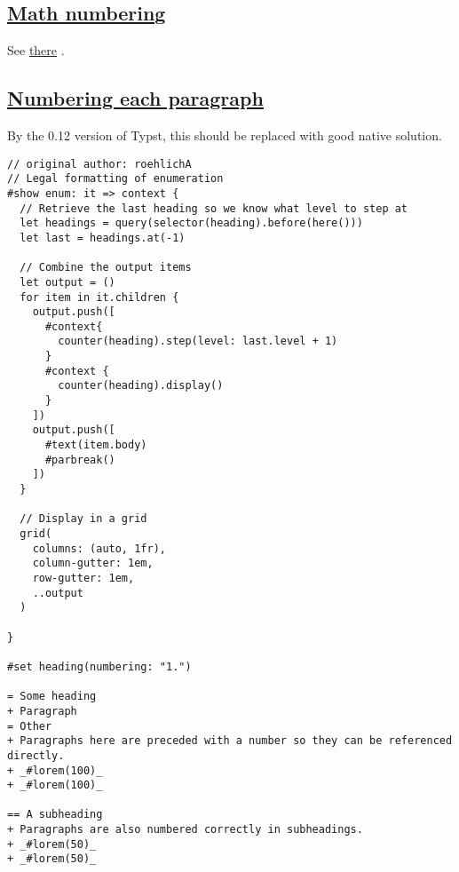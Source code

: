 \pandocbounded{}

\subsection{\texorpdfstring{\hyperref[math-numbering]{Math
numbering}}{Math numbering}}\label{math-numbering}

See \href{./math/numbering.html}{there} .

\subsection{\texorpdfstring{\hyperref[numbering-each-paragraph]{Numbering
each
paragraph}}{Numbering each paragraph}}\label{numbering-each-paragraph}

By the 0.12 version of Typst, this should be replaced with good native
solution.

\begin{verbatim}
// original author: roehlichA
// Legal formatting of enumeration
#show enum: it => context {
  // Retrieve the last heading so we know what level to step at
  let headings = query(selector(heading).before(here()))
  let last = headings.at(-1)

  // Combine the output items
  let output = ()
  for item in it.children {
    output.push([
      #context{
        counter(heading).step(level: last.level + 1)
      }
      #context {
        counter(heading).display() 
      }
    ])
    output.push([
      #text(item.body)
      #parbreak()
    ])
  }

  // Display in a grid
  grid(
    columns: (auto, 1fr),
    column-gutter: 1em,
    row-gutter: 1em,
    ..output
  )

}

#set heading(numbering: "1.")

= Some heading
+ Paragraph
= Other
+ Paragraphs here are preceded with a number so they can be referenced directly.
+ _#lorem(100)_
+ _#lorem(100)_

== A subheading
+ Paragraphs are also numbered correctly in subheadings.
+ _#lorem(50)_
+ _#lorem(50)_
\end{verbatim}

\pandocbounded{}
